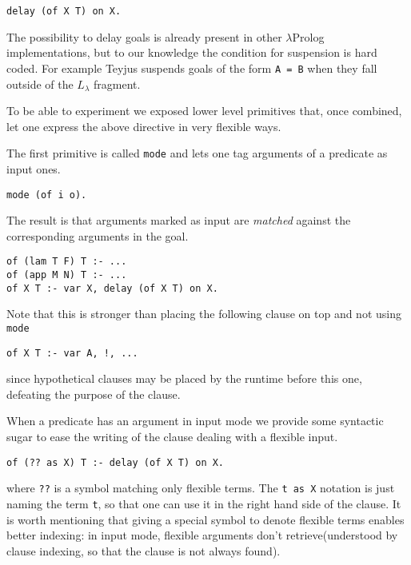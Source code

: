 \documentclass{easychair}
\begin{document}
\begin{verbatim}
delay (of X T) on X.
\end{verbatim}

The possibility to delay goals is already present in other $\lambda$Prolog
implementations, but to our knowledge the condition for suspension is
hard coded. For example Teyjus suspends goals of the form \verb+A = B+
when they fall outside of the $L_\lambda$ fragment.

To be able to experiment we exposed lower level primitives that, once
combined, let one express the above directive in very flexible ways.

The first primitive is called \verb+mode+ and lets one tag arguments of
a predicate as input ones.

\begin{verbatim}
mode (of i o).
\end{verbatim}

The result is that arguments marked as input are \emph{matched}
against the corresponding arguments in the goal.  

\begin{verbatim}
of (lam T F) T :- ...
of (app M N) T :- ...
of X T :- var X, delay (of X T) on X.
\end{verbatim}

Note that this is stronger than placing the following clause on top
and not using \verb+mode+

\begin{verbatim}
of X T :- var A, !, ...
\end{verbatim}

since hypothetical clauses may be placed by the runtime before this one,
defeating the purpose of the clause.

When a predicate has an argument in input mode we provide some syntactic sugar
to ease the writing of the clause dealing with a flexible input.

\begin{verbatim}
of (?? as X) T :- delay (of X T) on X.
\end{verbatim}

where \verb+??+ is a symbol matching only flexible terms.
The \verb+t as X+ notation
is just naming the term \verb+t+, so that one can use it in the right hand
side of the clause.
It is worth mentioning that giving a special symbol to denote
flexible terms enables better indexing: in input mode, flexible arguments don't retrieve(understood by clause indexing, so that the clause is not always found).  
\end{document}
